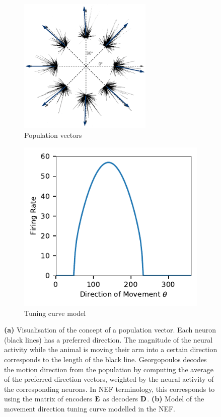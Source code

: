 \documentclass[10pt,letterpaper,oneside]{article}
\begin{document}
\begin{figure}
	\begin{subfigure}[b]{0.5\textwidth}
		\centering
		\includegraphics[width=0.7\textwidth]{media/georgopoulos_directions.png}
		\caption{Population vectors}
		\label{fig:population_vector}
	\end{subfigure}
	\begin{subfigure}[b]{0.5\textwidth}
		\centering
		\includegraphics{media/2d_tuning.pdf}
		\caption{Tuning curve model}
		\label{fig:georgopoulos_model}
	\end{subfigure}
	\caption{\textbf{(a)} Visualisation of the concept of a population vector. Each neuron (black lines) has a preferred direction. The magnitude of the neural activity while the animal is moving their arm into a certain direction corresponds to the length of the black line. Georgopoulos decodes the motion direction from the population by computing the average of the preferred direction vectors, weighted by the neural activity of the corresponding neurons. In NEF terminology, this corresponds to using the matrix of encoders ${\mathbf{E}}$ as decoders ${\mathbf{D}}$. \textbf{(b)} Model of the movement direction tuning curve modelled in the NEF. }
\end{figure}
\end{document}
